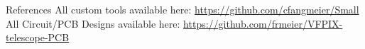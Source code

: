 \documentclass{beamer}
\begin{document}
\section{}
\begin{frame}{References}
  All custom tools available here: \url{https://github.com/cfangmeier/Small}
  \vspace{.2in}
  \hline
  \vspace{.2in}
  All Circuit/PCB Designs available here: \url{https://github.com/frmeier/VFPIX-telescope-PCB}
\end{frame}
\end{document}
